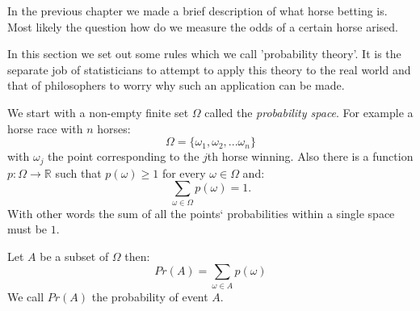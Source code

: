 In the previous chapter we made a brief description of what horse betting is. Most likely the question how do we measure the odds of a certain horse arised.

In this section we set out some rules which we call 'probability theory'. It is the separate job of statisticians to attempt to apply this theory to the real world and that of philosophers to worry why such an application can be made.

We start with a non-empty finite set $\Omega$ called the \textit{probability space}. For example a horse race with $n$ horses:
\[ \Omega = \lbrace \omega_1, \omega_2, ... \omega_n \rbrace \]
with $\omega_j$ the point corresponding to the $j$th horse winning.
Also there is a function $p : \Omega \rightarrow \mathbb{R}$ such that $p(\omega)\geq 1$ for every $\omega\in\Omega$ and:
\[ \sum\limits_{\omega\in\Omega} p(\omega) = 1. \]
With other words the sum of all the points` probabilities within a single space must be $1$.

Let $A$ be a subset of $\Omega$ then:
\[ Pr(A) = \sum\limits_{\omega\in A} p(\omega) \]
We call $Pr(A)$ the probability of event $A$.